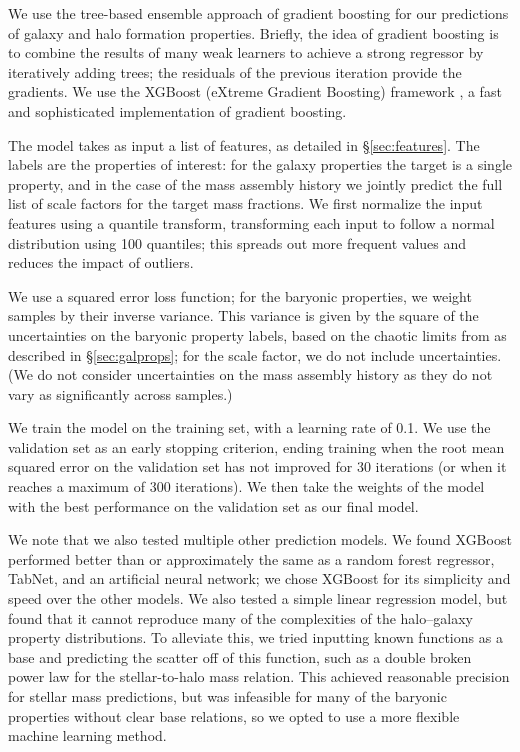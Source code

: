 We use the tree-based ensemble approach of gradient boosting \citep{friedman_greedy_2001} for our predictions of galaxy and halo formation properties.
Briefly, the idea of gradient boosting is to combine the results of many weak learners to achieve a strong regressor by iteratively adding trees; the residuals of the previous iteration provide the gradients.
We use the XGBoost (eXtreme Gradient Boosting) framework \citep{chen_xgboost_2016}, a fast and sophisticated implementation of gradient boosting.

The model takes as input a list of features, as detailed in \S\ref{sec:features}.
The labels are the properties of interest: for the galaxy properties the target is a single property, and in the case of the mass assembly history we jointly predict the full list of scale factors for the target mass fractions.
We first normalize the input features using a quantile transform, transforming each input to follow a normal distribution using 100 quantiles; this spreads out more frequent values and reduces the impact of outliers.

We use a squared error loss function; for the baryonic properties, we weight samples by their inverse variance.
This variance is given by the square of the uncertainties on the baryonic property labels, based on the chaotic limits from \cite{Genel2019} as described in \S\ref{sec:galprops}; for the scale factor, we do not include uncertainties.
(We do not consider uncertainties on the mass assembly history as they do not vary as significantly across samples.)

We train the model on the training set, with a learning rate of 0.1.
We use the validation set as an early stopping criterion, ending training when the root mean squared error on the validation set has not improved for 30 iterations (or when it reaches a maximum of 300 iterations).
We then take the weights of the model with the best performance on the validation set as our final model.

We note that we also tested multiple other prediction models. 
We found XGBoost performed better than or approximately the same as a random forest regressor, TabNet, and an artificial neural network; we chose XGBoost for its simplicity and speed over the other models.
We also tested a simple linear regression model, but found that it cannot reproduce many of the complexities of the halo--galaxy property distributions.
To alleviate this, we tried inputting known functions as a base and predicting the scatter off of this function, such as a double broken power law for the stellar-to-halo mass relation.
This achieved reasonable precision for stellar mass predictions, but was infeasible for many of the baryonic properties without clear base relations, so we opted to use a more flexible machine learning method.


